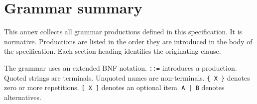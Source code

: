 \chapter{Grammar summary}
\label{annex:A-grammar}

\pnum
This annex collects all grammar productions defined in this specification.
It is normative.  Productions are listed in the order they are introduced
in the body of the specification.  Each section heading identifies the
originating clause.

\pnum
The grammar uses an extended BNF notation.  \texttt{::=} introduces a
production.  Quoted strings are terminals.  Unquoted names are
non-terminals.  \texttt{\{~X~\}} denotes zero or more repetitions.
\texttt{[~X~]} denotes an optional item.  \texttt{A | B} denotes
alternatives.


